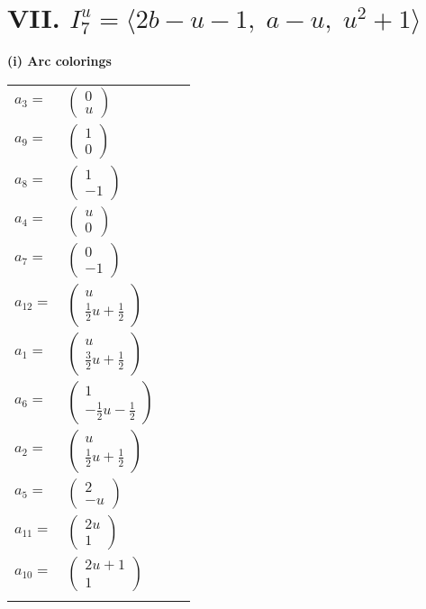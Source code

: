 \documentclass[1p]{elsarticle_modified}
\theoremstyle{definition}
\begin{document}
\centering \section*{VII. $I^u_{7}= \langle 2 b- u-1,\;a- u,\;u^2+1 \rangle$}
\flushleft \textbf{(i) Arc colorings}\\
\begin{tabular}{m{7pt} m{180pt} m{7pt} m{180pt} }
\flushright $a_{3}=$&$\begin{pmatrix}0\\u\end{pmatrix}$ \\
\flushright $a_{9}=$&$\begin{pmatrix}1\\0\end{pmatrix}$ \\
\flushright $a_{8}=$&$\begin{pmatrix}1\\-1\end{pmatrix}$ \\
\flushright $a_{4}=$&$\begin{pmatrix}u\\0\end{pmatrix}$ \\
\flushright $a_{7}=$&$\begin{pmatrix}0\\-1\end{pmatrix}$ \\
\flushright $a_{12}=$&$\begin{pmatrix}u\\\frac{1}{2} u+\frac{1}{2}\end{pmatrix}$ \\
\flushright $a_{1}=$&$\begin{pmatrix}u\\\frac{3}{2} u+\frac{1}{2}\end{pmatrix}$ \\
\flushright $a_{6}=$&$\begin{pmatrix}1\\-\frac{1}{2} u-\frac{1}{2}\end{pmatrix}$ \\
\flushright $a_{2}=$&$\begin{pmatrix}u\\\frac{1}{2} u+\frac{1}{2}\end{pmatrix}$ \\
\flushright $a_{5}=$&$\begin{pmatrix}2\\- u\end{pmatrix}$ \\
\flushright $a_{11}=$&$\begin{pmatrix}2 u\\1\end{pmatrix}$ \\
\flushright $a_{10}=$&$\begin{pmatrix}2 u+1\\1\end{pmatrix}$\\&\end{tabular}
\end{document}
